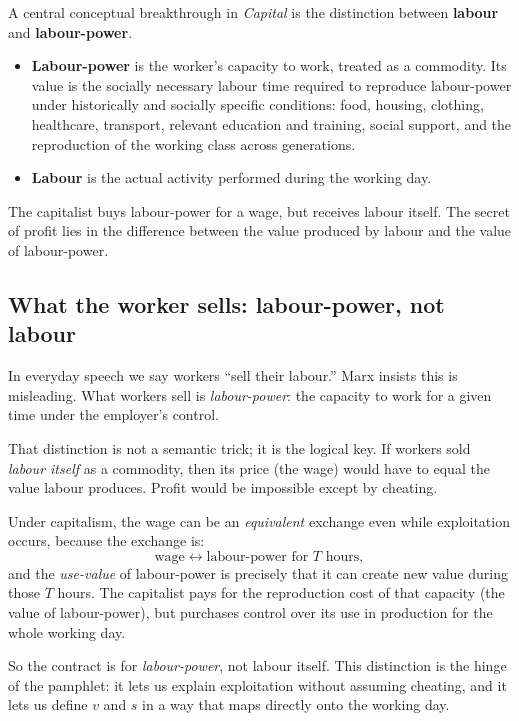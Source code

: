 A central conceptual breakthrough in \emph{Capital} is the distinction between
\textbf{labour} and \textbf{labour-power}.\cite{Marx1867}

\begin{itemize}[leftmargin=1.5em]
  \item \textbf{Labour-power} is the worker's capacity to work, treated as a commodity. Its value is the socially necessary labour time required to reproduce labour-power under historically and socially specific conditions: food, housing, clothing, healthcare, transport, relevant education and training, social support, and the reproduction of the working class across generations.
  \item \textbf{Labour} is the actual activity performed during the working
  day.
\end{itemize}

The capitalist buys labour-power for a wage, but receives labour itself. The
secret of profit lies in the difference between the value produced by labour
and the value of labour-power.

\subsection{What the worker sells: labour-power, not labour}
\label{sec:labourpower-not-labour}

In everyday speech we say workers ``sell their labour.'' Marx insists this is
misleading. What workers sell is \emph{labour-power}: the capacity to work for a
given time under the employer’s control.

That distinction is not a semantic trick; it is the logical key. If workers sold
\emph{labour itself} as a commodity, then its price (the wage) would have to equal
the value labour produces. Profit would be impossible except by cheating.

Under capitalism, the wage can be an \emph{equivalent} exchange even while exploitation
occurs, because the exchange is:
\[
  \text{wage} \longleftrightarrow \text{labour-power for } T \text{ hours},
\]
and the \emph{use-value} of labour-power is precisely that it can create new value
during those $T$ hours. The capitalist pays for the reproduction cost of that capacity
(the value of labour-power), but purchases control over its use in production for the
whole working day.

So the contract is for \emph{labour-power}, not labour itself. This distinction is the
hinge of the pamphlet: it lets us explain exploitation without assuming cheating, and it
lets us define $v$ and $s$ in a way that maps directly onto the working day.

